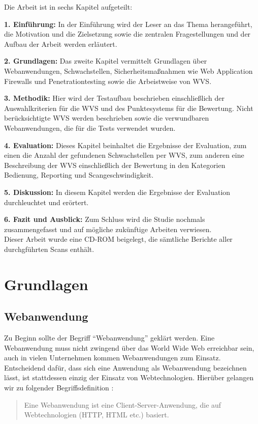 \documentclass[12pt,oneside,a4paper,parskip]{scrbook}
\begin{document}
Die Arbeit ist in sechs Kapitel aufgeteilt:

\textbf{1. Einführung:} In der Einführung wird der Leser an das Thema herangeführt, die Motivation und die Zielsetzung  sowie die zentralen Fragestellungen und der Aufbau der Arbeit werden erläutert.

\textbf{2. Grundlagen:} Das zweite Kapitel vermittelt Grundlagen über Webanwendungen, Schwachstellen,  Sicherheitsmaßnahmen wie Web Application Firewalls und Penetrationtesting sowie die Arbeistweise von WVS.

\textbf{3. Methodik:} Hier wird der Testaufbau beschrieben einschließlich der Auswahlkriterien für die WVS und des Punktesystems für die Bewertung. Nicht berücksichtigte WVS werden beschrieben sowie die verwundbaren Webanwendungen, die für die Tests verwendet wurden.

\textbf{4. Evaluation:} Dieses Kapitel beinhaltet die Ergebnisse der Evaluation, zum einen die Anzahl der gefundenen Schwachstellen per WVS, zum anderen eine Beschreibung der WVS einschließlich der Bewertung in den Kategorien Bedienung, Reporting und Scangeschwindigkeit.

\textbf{5. Diskussion:} In diesem Kapitel werden die Ergebnisse der Evaluation durchleuchtet und erörtert.

\textbf{6. Fazit und Ausblick:} Zum Schluss wird die Studie nochmals zusammengefasst und auf mögliche zukünftige Arbeiten verwiesen.\\

Dieser Arbeit wurde eine CD-ROM beigelegt, die sämtliche Berichte aller durchgführten Scans enthält.

\chapter{Grundlagen}
  \section{Webanwendung}
  Zu Beginn sollte der Begriff ``Webanwendung'' geklärt werden.
  Eine Webanwendung muss nicht zwingend über das World Wide Web erreichbar sein, auch in vielen Unternehmen kommen Webanwendungen zum Einsatz. Entscheidend dafür, dass sich eine Anwendung als Webanwendung bezeichnen lässt, ist stattdessen einzig der Einsatz von Webtechnologien. Hierüber gelangen wir zu folgender Begriffsdefinition \cite{Rohr}:

  \begin{quote}Eine Webanwendung ist eine Client-Server-Anwendung, die auf Webtechnologien (HTTP, HTML etc.) basiert.\end{quote}
\end{document}
